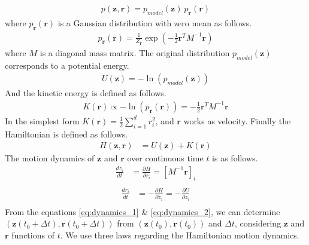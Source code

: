 \documentclass[a4]{article}
\begin{document}
\begin{equation}
\begin{aligned}
p(\bm{z}, \bm{r}) = p_{model}(\bm{z})\:p_{\bm{r}}(\bm{r})
\end{aligned}
\end{equation}
where $p_{\bm{r}}(\bm{r})$ is a Gaussian distribution with zero mean as follows.
\begin{equation}
\begin{aligned}
p_{\bm{r}}(\bm{r}) = \frac{1}{Z_{\bm{r}}} \exp \left( -\frac{1}{2}\bm{r}^T M^{-1}\bm{r}\right)
\end{aligned}
\end{equation}
where $M$ is a diagonal mass matrix.
The original distribution $p_{model}(\bm{z})$ corresponds to a potential energy.
\begin{equation}
\begin{aligned}
U(\bm{z}) = -\ln\left(p_{model}(\bm{z})\right)
\end{aligned}
\end{equation}
And the kinetic energy is defined as follows.
\begin{equation}
\begin{aligned}
K(\bm{r}) \propto -\ln\left(p_{\bm{r}}(\bm{r})\right)= -\frac{1}{2}\bm{r}^T M^{-1}\bm{r}
\end{aligned}
\end{equation}
In the simplest form $K(\bm{r}) = \frac{1}{2} \sum_{i=1}^{d}r_i^2$, and $\bm{r}$ works as velocity.
Finally the Hamiltonian is defined as follows.
\begin{equation}
\begin{aligned}
H(\bm{z}, \bm{r}) &= U(\bm{z}) + K(\bm{r})
\end{aligned}
\end{equation}
The motion dynamics of $\bm{z}$ and $\bm{r}$ over continuous time $t$ is as follows.
\begin{equation}
\begin{aligned}
\frac{dz_i}{dt} &= \frac{{\partial}H}{\partial r_i}  = \left[M^{-1}\bm{r}\right]_i\label{eq:dynamics_1}\\
\end{aligned}
\end{equation}
\begin{equation}
\begin{aligned}
\frac{dr_i}{dt} &= -\frac{{\partial}H}{\partial z_i} = 
-\frac{{\partial}U}{\partial z_i}\label{eq:dynamics_2}\\
\end{aligned}
\end{equation}
From the equations \ref{eq:dynamics_1} \& \ref{eq:dynamics_2}, we can determine
$\left(\bm{z}(t_0 + {\Delta}t), \bm{r}(t_0 + {\Delta}t)\right)$ from 
$\left(\bm{z}(t_0), \bm{r}(t_0)\right)$ and ${\Delta}t$, considering $\bm{z}$ and $\bm{r}$ functions of $t$.
We use three laws regarding the Hamiltonian motion dynamics.
\end{document}
